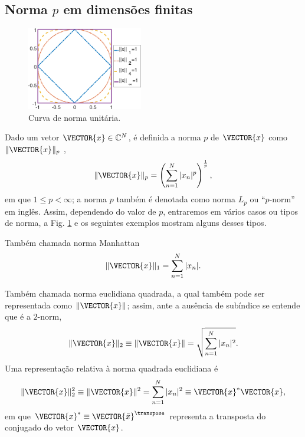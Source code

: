 \subsection{Norma $p$ em dimensões finitas} %
\label{subsec:pnorm}
\begin{figure}
     \centering
     \vspace{-15pt}
     \includegraphics[width=0.45\textwidth]{chapters/notacao/pnormcode.eps}
     \caption{Curva de norma unitária.}
     \label{fig:curvaunit}
     \vspace{-30pt}
\end{figure}
Dado um vetor $\VECTOR{x} \in \mathbb{C}^{N}$,
é definida a norma $p$ de $\VECTOR{x}$  como $\|\VECTOR{x}\|_p$ \cite[pp. 33]{vetterli2014foundations}, 
\begin{equation}
\|\VECTOR{x}\|_p=\left(\sum_{n=1}^N |x_n|^p\right)^{\frac{1}{p}},
\end{equation}
em que $1 \leq p < \infty$; a norma $p$
também é denotada como norma $L_p$ ou ``$p$-norm'' em inglês.
Assim, dependendo do valor de $p$, entraremos em vários casos ou tipos de norma,
a Fig. \ref{fig:curvaunit} e os seguintes exemplos mostram alguns desses tipos.

\begin{example}[Norma taxicab - $p=1$:] Também chamada norma Manhattan
\begin{equation}
\|\VECTOR{x}\|_1=\sum_{n=1}^N |x_n|.
\end{equation}
\end{example}

\begin{example}[Norma euclidiana - $p=2$:] Também chamada norma euclidiana quadrada, 
a qual também pode ser representada como $\|\VECTOR{x}\|$; 
assim, ante a ausência de subíndice se entende que é a $2$-norm,
\begin{equation}
\|\VECTOR{x}\|_2\equiv \|\VECTOR{x}\| =\sqrt{\sum_{n=1}^N |x_n|^2}.
\end{equation}
Uma representação relativa à norma quadrada euclidiana é
\begin{equation}
\|\VECTOR{x}\|_2^2\equiv \|\VECTOR{x}\|^2=\sum_{n=1}^N |x_n|^2\equiv \VECTOR{x}^{*} \VECTOR{x},
\end{equation}
em que $\VECTOR{x}^{*}\equiv \VECTOR{\bar{x}}^{\transpose}$ 
representa a transposta do conjugado do vetor  $\VECTOR{x}$. 
\end{example}

